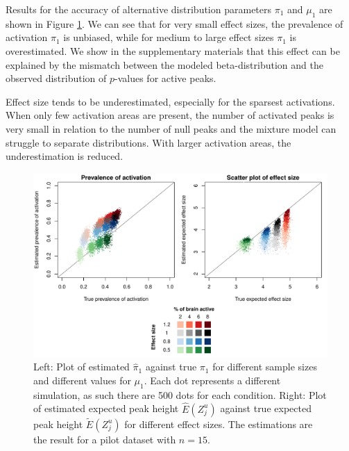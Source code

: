 Results for the accuracy of alternative distribution parameters $\pi_1$ and $\mu_1$ are shown in Figure \ref{SIM_model}.  We can see that for very small effect sizes, the prevalence of activation $\pi_1$ is unbiased, while for medium to large effect sizes $\pi_1$ is overestimated.  We show in the supplementary materials that this effect can be explained by the mismatch between the modeled beta-distribution and the observed distribution of $p$-values for active peaks.

Effect size tends to be underestimated, especially for the sparsest activations.  When only few activation areas are present, the number of activated peaks is very small in relation to the number of null peaks and the mixture model can struggle to separate distributions.
With larger activation areas, the underestimation is reduced.

\begin{center}
\begin{figure}[h]
\includegraphics[scale=0.8]{figures/FIG_SIM_modelestimation_15_NOMASK_2_5.pdf}
\caption{Left: Plot of estimated $\hat\pi_1$ against true $\pi_1$ for different sample sizes and different values for $\mu_1$. Each dot represents a different simulation, as such there are 500 dots for each condition.  Right: Plot of estimated expected peak height $\hat{E}(Z_j^u)$ against true expected peak height $\widetilde{E}(Z_j^u)$ for different effect sizes. The estimations are the result for a pilot dataset with $n=15$.  \label{SIM_model}}
\end{figure}
\end{center}

